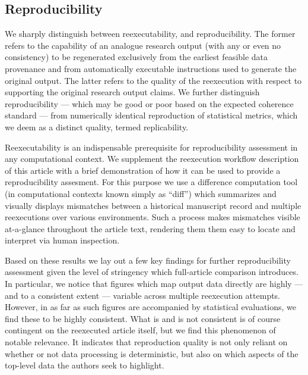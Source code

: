 \subsection{Reproducibility}

We sharply distinguish between reexecutability, and reproducibility.
The former refers to the capability of an analogue research output (with any or even no consistency) to be regenerated exclusively from the earliest feasible data provenance and from automatically executable instructions used to generate the original output.
The latter refers to the quality of the reexecution with respect to supporting the original research output claims.
We further distinguish reproducibility — which may be good or poor based on the expected coherence standard — from numerically identical reproduction of statistical metrics, which we deem as a distinct quality, termed replicability.

Reexecutability is an indispensable prerequisite for reproducibility assessment in any computational context.
We supplement the reexecution workflow description of this article with a brief demonstration of how it can be used to provide a reproducibility assesment.
For this purpose we use a difference computation tool (in computational contexts known simply as “diff”) which summarizes and visually displays mismatches between a historical manuscript record and multiple reexecutions over various environments.
Such a process makes mismatches visible at-a-glance throughout the article text, rendering them them easy to locate and interpret via human inspection.

Based on these results we lay out a few key findings for further reproducibility assessment given the level of stringency which full-article comparison introduces.
In particular, we notice that figures which map output data directly are highly — and to a consistent extent — variable across multiple reexecution attempts.
However, in as far as such figures are accompanied by statistical evaluations, we find these to be highly consistent.
What is and is not consistent is of course contingent on the reexecuted article itself, but we find this phenomenon of notable relevance.
It indicates that reproduction quality is not only reliant on whether or not data processing is deterministic, but also on which aspects of the top-level data the authors seek to highlight.

